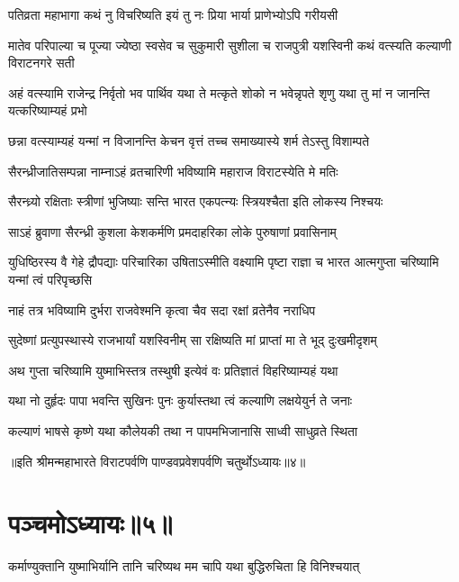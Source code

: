 \twolineshloka
{पतिव्रता महाभागा कथं नु विचरिष्यति}
{इयं तु नः प्रिया भार्या प्राणेभ्योऽपि गरीयसी}


\threelineshloka
{मातेव परिपाल्या च पूज्या ज्येष्ठा स्वसेव च}
{सुकुमारी सुशीला च राजपुत्री यशस्विनी}
{कथं वत्स्यति कल्याणी विराटनगरे सती}




\threelineshloka
{अहं वत्स्यामि राजेन्द्र निर्वृतो भव पार्थिव}
{यथा ते मत्कृते शोको न भवेन्नृपते शृणु}
{यथा तु मां न जानन्ति यत्करिष्याम्यहं प्रभो}


\twolineshloka
{छन्ना वत्स्याम्यहं यन्मां न विजानन्ति केचन}
{वृत्तं तच्च समाख्यास्ये शर्म तेऽस्तु विशाम्पते}


\twolineshloka
{सैरन्ध्रीजातिसम्पन्ना नाम्नाऽहं व्रतचारिणी}
{भविष्यामि महाराज विराटस्येति मे मतिः}


\twolineshloka
{सैरन्ध्र्यो रक्षिताः स्त्रीणां भुजिष्याः सन्ति भारत}
{एकपत्न्यः स्त्रियश्चैता इति लोकस्य निश्चयः}


\twolineshloka
{साऽहं ब्रुवाणा सैरन्ध्री कुशला केशकर्मणि}
{प्रमदाहरिका लोके पुरुषाणां प्रवासिनाम्}


\threelineshloka
{युधिष्ठिरस्य वै गेहे द्रौपद्याः परिचारिका}
{उषिताऽस्मीति वक्ष्यामि पृष्टा राज्ञा च भारत}
{आत्मगुप्ता चरिष्यामि यन्मां त्वं परिपृच्छसि}


\twolineshloka
{नाहं तत्र भविष्यामि दुर्भरा राजवेश्मनि}
{कृत्वा चैव सदा रक्षां व्रतेनैव नराधिप}


\twolineshloka
{सुदेष्णां प्रत्युपस्थास्ये राजभार्यां यशस्विनीम्}
{सा रक्षिष्यति मां प्राप्तां मा ते भूद् दुःखमीदृशम्}


\twolineshloka
{अथ गुप्ता चरिष्यामि युष्माभिस्तत्र तस्थुषी}
{इत्येवं वः प्रतिज्ञातं विहरिष्याम्यहं यथा}




\twolineshloka
{यथा नो दुर्हृदः पापा भवन्ति सुखिनः पुनः}
{कुर्यास्तथा त्वं कल्याणि लक्षयेयुर्न ते जनाः}


\twolineshloka
{कल्याणं भाषसे कृष्णे यथा कौलेयकी तथा}
{न पापमभिजानासि साध्वी साधुव्रते स्थिता}

॥इति श्रीमन्महाभारते विराटपर्वणि पाण्डवप्रवेशपर्वणि चतुर्थोऽध्यायः॥४॥

\chapter{पञ्चमोऽध्यायः॥५॥}

\twolineshloka
{कर्माण्युक्तानि युष्माभिर्यानि तानि चरिष्यथ}
{मम चापि यथा बुद्धिरुचिता हि विनिश्चयात्}


